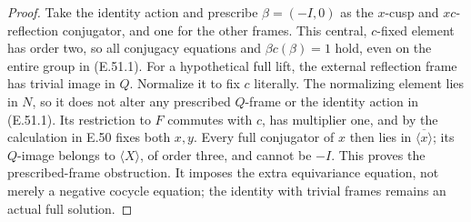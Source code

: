 \begin{proof}
Take the identity action and prescribe \(\beta=(-I,0)\) as the
\(x\)-cusp and \(xc\)-reflection conjugator, and one for the other
frames. This central, \(c\)-fixed element has order two, so all
conjugacy equations and \(\beta c(\beta)=1\) hold, even on the
entire group in (E.51.1).
For a hypothetical full lift, the external reflection frame has trivial
image in \(Q\). Normalize it to fix \(c\) literally. The normalizing
element lies in \(N\), so it does not alter any prescribed \(Q\)-frame
or the identity action in (E.51.1). Its restriction to \(F\) commutes
with \(c\), has multiplier one, and by the calculation in E.50 fixes
both \(x,y\). Every full conjugator of \(x\) then lies in
\(\overline{\langle x\rangle}\); its \(Q\)-image belongs to
\(\langle X\rangle\), of order three, and cannot be \(-I\).
This proves the prescribed-frame obstruction. It imposes the extra
equivariance equation, not merely a negative cocycle equation; the
identity with trivial frames remains an actual full solution.
\end{proof}

